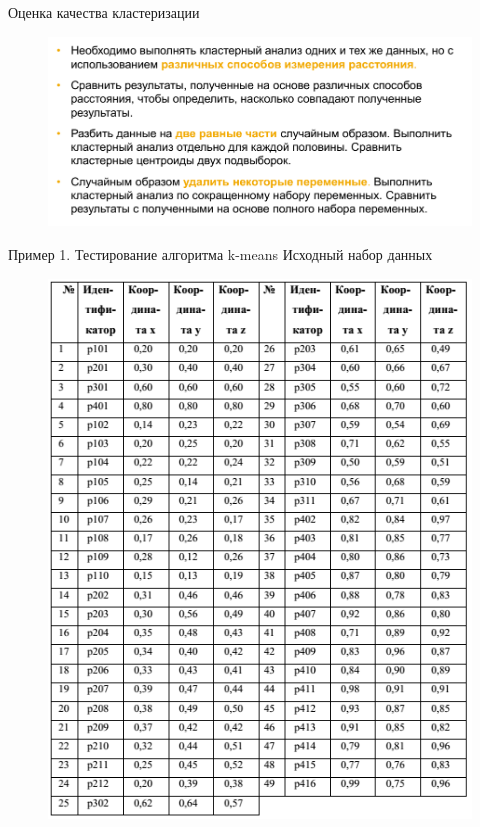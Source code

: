 \documentclass{beamer}
\begin{document}
\begin{frame}{Оценка качества кластеризации}
\begin{figure}[h]
\centering
\includegraphics[scale=0.5]{images/lec07-pic27.png}
\end{figure}
\end{frame}

\begin{frame}{Пример 1. Тестирование алгоритма k-means}
Исходный набор данных
\begin{figure}[h]
\centering
\includegraphics[scale=0.4]{images/lec07-pic32.png}
\end{figure}
\end{frame}
\end{document}
